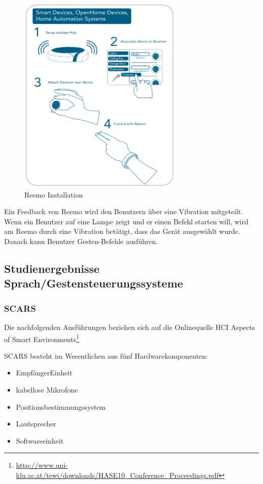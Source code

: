 \begin{figure}[h!]
	\centering
	\includegraphics[width=0.7\textwidth]{img/Feedback-Mechanismen/ReemoInstallation2.png}
	\caption{Reemo Installation}
	\label{fig:feedbackReemoInstallation2}
\end{figure}

\newpage

\noindent
Ein Feedback von Reemo wird den Benutzern über eine Vibration mitgeteilt. Wenn ein Benutzer auf eine Lampe zeigt und er einen Befehl starten will, wird am Reemo durch eine Vibration betätigt, dass das Gerät ausgewählt wurde. Danach kann Benutzer Gesten-Befehle ausführen.

\subsection{Studienergebnisse Sprach/Gestensteuerungssysteme}

\subsubsection{SCARS}

Die nachfolgenden Ausführungen beziehen sich auf die Onlinequelle \glqq HCI Aspects of Smart Environments\grqq\footnote{\url{http://www.uni-klu.ac.at/tewi/downloads/HASE10_Conference_Proceedings.pdf}}

\noindent
SCARS besteht im Wesentlichen aus fünf Hardwarekomponenten:

\begin{itemize}
\item EmpfängerEinheit
\item kabellose Mikrofone
\item Positionsbestimmungssystem
\item Lautsprecher
\item Softwareeinheit
\end{itemize}

